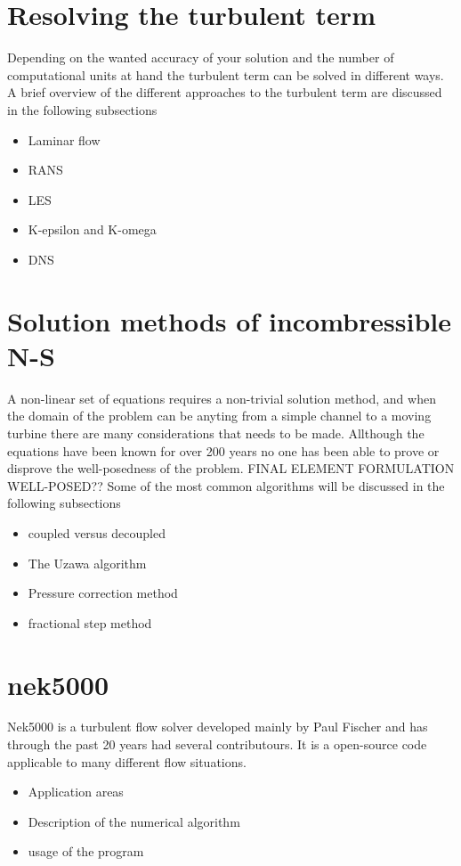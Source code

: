 \section{Resolving the turbulent term}
Depending on the wanted accuracy of your solution and the number of computational units at hand the turbulent term can be solved in 
different ways. A brief overview of the different approaches to the turbulent term are discussed in the following subsections

\begin{itemize}
	\item Laminar flow
	\item RANS
	\item LES
	\item K-epsilon and K-omega
	\item DNS
\end{itemize}

\section{Solution methods of incombressible N-S}
A non-linear set of equations requires a non-trivial solution method, and when the domain of the problem can be anyting from a simple channel 
to a moving turbine there are many considerations that needs to be made. Allthough the equations have been known for over 200 years no one 
has been able to prove or disprove the well-posedness of the problem. FINAL ELEMENT FORMULATION WELL-POSED?? Some of the most common algorithms 
will be discussed in the following subsections

\begin{itemize}
\item coupled versus decoupled 
\item The Uzawa algorithm 
\item Pressure correction method
\item fractional step method
\end{itemize}

\section{nek5000}
Nek5000 is a turbulent flow solver developed mainly by Paul Fischer and has through the past 20 years had several contributours. 
It is a open-source code applicable to many different flow situations.   

\begin{itemize}
\item Application areas
\item Description of the numerical algorithm 
\item usage of the program 
\end{itemize}

